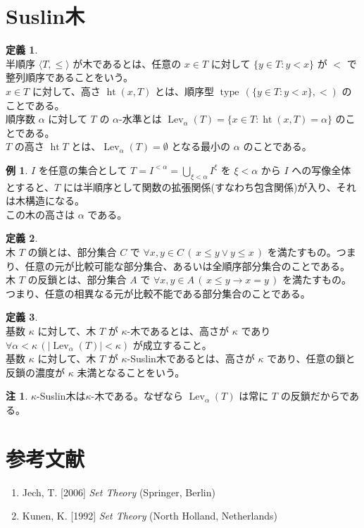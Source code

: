 \documentclass{jsarticle}
\theoremstyle{definition}
\newtheorem*{definition*}{定義}
\newtheorem{remark}{注}[section]
\newtheorem{example}{例}[section]
\begin{document}
    \section{Suslin木}
    \begin{definition*} \ \\
        半順序 $\langle T, \leq \rangle$ が木であるとは、任意の $x \in T$ に対して $\{y \in T : y < x\}$ が $<$ で整列順序であることをいう。\\
        $x \in T$ に対して、高さ $\operatorname{ht}(x, T)$ とは、順序型 $\operatorname{type}\,(\{y \in T : y < x\}, <)$ のことである。\\
        順序数 $\alpha$ に対して $T$ の $\alpha$-水準とは $\operatorname{Lev}_\alpha(T) = \{x \in T : \operatorname{ht}(x, T) = \alpha\}$ のことである。\\
        $T$ の高さ $\operatorname{ht} T$ とは、$\operatorname{Lev}_\alpha(T) = \emptyset$ となる最小の $\alpha$ のことである。
    \end{definition*}
    \begin{example}
        $I$ を任意の集合として $\displaystyle T = I^{<\alpha} = \bigcup_{\xi < \alpha} I^\xi$ を $\xi < \alpha$ から $I$ への写像全体とすると、$T$ には半順序として関数の拡張関係(すなわち包含関係)が入り、それは木構造になる。\\
        この木の高さは $\alpha$ である。
    \end{example}
    
    \vspace{0.5ex}
    
    \begin{definition*} \ \\
        木 $T$ の鎖とは、部分集合 $C$ で $\forall x,y \in C \, (\,x \leq y \lor y \leq x\,)$ を満たすもの。つまり、任意の元が比較可能な部分集合、あるいは全順序部分集合のことである。\\
        木 $T$ の反鎖とは、部分集合 $A$ で $\forall x,y \in A \, (\,x \leq y \rightarrow x = y\,)$ を満たすもの。つまり、任意の相異なる元が比較不能である部分集合のことである。
    \end{definition*}
    \begin{definition*} \ \\
        基数 $\kappa$ に対して、木 $T$ が $\kappa$-木であるとは、高さが $\kappa$ であり $\forall \alpha < \kappa \, (|\operatorname{Lev}_\alpha(T)| < \kappa)$ が成立すること。\\
        基数 $\kappa$ に対して、木 $T$ が $\kappa$-Suslin木であるとは、高さが $\kappa$ であり、任意の鎖と反鎖の濃度が $\kappa$ 未満となることをいう。
    \end{definition*}
    \begin{remark}
        $\kappa$-Suslin木は$\kappa$-木である。なぜなら $\operatorname{Lev}_\alpha(T)$ は常に $T$ の反鎖だからである。
    \end{remark}
    
    \section{参考文献}
    \begin{enumerate}[]
        \item Jech, T. [2006] {\it Set Theory} (Springer, Berlin)
        \item Kunen, K. [1992] {\it Set Theory} (North Holland, Netherlands)
    \end{enumerate}
\end{document}
